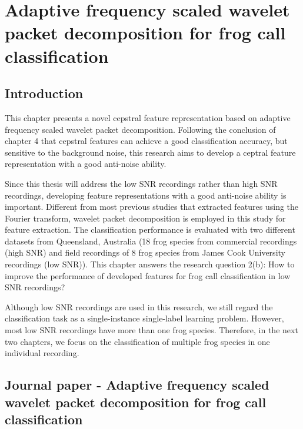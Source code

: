 
\chapter{Adaptive frequency scaled wavelet packet decomposition for frog call classification}
\label{cha:cha5Wavelet}


\section{Introduction}
This chapter presents a novel cepstral feature representation based on adaptive frequency scaled wavelet packet decomposition. Following the conclusion of chapter 4 that cepstral features can achieve a good classification accuracy, but sensitive to the background noise, this research aims to develop a ceptral feature representation with a good anti-noise ability.



Since this thesis will address the low SNR recordings rather than high SNR recordings, developing feature representations with a good anti-noise ability is important. Different from most previous studies that extracted features using the Fourier transform, wavelet packet decomposition is employed in this study for feature extraction. The classification performance is evaluated with two different datasets from Queensland, Australia (18 frog species from commercial recordings (high SNR) and field recordings of 8 frog species from James Cook University recordings (low SNR)). This chapter answers the research question 2(b): How to improve the performance of developed features for frog call classification in low SNR recordings? 


Although low SNR recordings are used in this research, we still regard the classification task as a single-instance single-label learning problem.
However, most low SNR recordings have more than one frog species. Therefore, in the next two chapters, we focus on the classification of multiple frog species in one individual recording.





\section{Journal paper - Adaptive frequency scaled wavelet packet decomposition for frog call classification}





